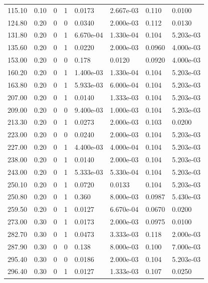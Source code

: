 \documentclass[preview]{standalone}
\begin{document}
{{\begin{tabular}{L{1.2cm}C{1.2cm} C{0.3cm}C{0.5cm} C{1.4cm}C{1.4cm} C{1.4cm}C{1.4cm}}
  115.10  &  0.10  & 0     &  1 &  0.0173  & 2.667e-03  & 0.110 &  0.0100   \\ 
  124.80  &  0.20  & 0     &  0 &  0.0340  & 2.000e-03  & 0.112 &  0.0130   \\ 
  131.80  &  0.20  & 0     &  1 &  6.670e-04  & 1.330e-04  & 0.104 &  5.203e-03   \\ 
  135.60  &  0.20  & 0     &  1 &  0.0220  & 2.000e-03  & 0.0960 &  4.000e-03   \\ 
  153.00  &  0.20  & 0     &  0 &  0.178  & 0.0120  & 0.0920 &  4.000e-03   \\ 
  160.20  &  0.20  & 0     &  1 &  1.400e-03  & 1.330e-04  & 0.104 &  5.203e-03   \\ 
  163.80  &  0.20  & 0     &  1 &  5.933e-03  & 6.000e-04  & 0.104 &  5.203e-03   \\ 
  207.00  &  0.20  & 0     &  1 &  0.0140  & 1.333e-03  & 0.104 &  5.203e-03   \\ 
  209.00  &  0.20  & 0     &  0 &  9.400e-03  & 1.000e-03  & 0.104 &  5.203e-03   \\ 
  213.30  &  0.20  & 0     &  1 &  0.0273  & 2.000e-03  & 0.103 &  0.0200   \\ 
  223.00  &  0.20  & 0     &  0 &  0.0240  & 2.000e-03  & 0.104 &  5.203e-03   \\ 
  227.00  &  0.20  & 0     &  1 &  4.400e-03  & 4.000e-04  & 0.104 &  5.203e-03   \\ 
  238.00  &  0.20  & 0     &  1 &  0.0140  & 2.000e-03  & 0.104 &  5.203e-03   \\ 
  243.00  &  0.20  & 0     &  1 &  5.333e-03  & 5.330e-04  & 0.104 &  5.203e-03   \\ 
  250.10  &  0.20  & 0     &  1 &  0.0720  & 0.0133  & 0.104 &  5.203e-03   \\ 
  250.80  &  0.20  & 0     &  1 &  0.360  & 8.000e-03  & 0.0987 &  5.430e-03   \\ 
  259.50  &  0.20  & 0     &  1 &  0.0127  & 6.670e-04  & 0.0670 &  0.0200   \\ 
  273.00  &  0.30  & 0     &  1 &  0.0173  & 2.000e-03  & 0.0975 &  0.0100   \\ 
  282.70  &  0.30  & 0     &  1 &  0.0473  & 3.333e-03  & 0.118 &  2.000e-03   \\ 
  287.90  &  0.30  & 0     &  0 &  0.138  & 8.000e-03  & 0.100 &  7.000e-03   \\ 
  295.40  &  0.30  & 0     &  0 &  0.0186  & 2.000e-03  & 0.104 &  5.203e-03   \\ 
  296.40  &  0.30  & 0     &  1 &  0.0127  & 1.333e-03  & 0.107 &  0.0250   \\ 

\end{tabular}}}
\end{document}
